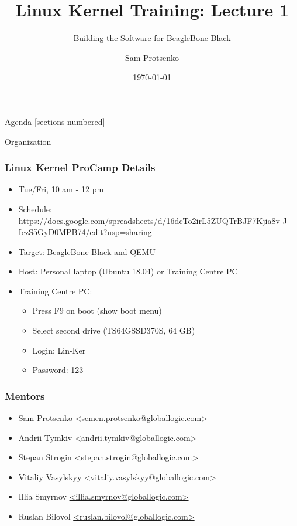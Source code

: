 \documentclass[aspectratio=169]{beamer}
\title{Linux Kernel Training: Lecture 1}
\subtitle{Building the Software for BeagleBone Black}
\date{\today}
\author{Sam Protsenko}
\institute{GlobalLogic}
\begin{document}
\maketitle

\begin{frame}{Agenda}
  [sections numbered]
  \tableofcontents[hideallsubsections]
\end{frame}

\begin{frame}[standout]
  Organization
\end{frame}

\begin{frame}
  \frametitle{Linux Kernel ProCamp Details}
  \begin{itemize}
  \item Tue/Fri, 10 am - 12 pm
  \item Schedule: \url{https://docs.google.com/spreadsheets/d/16dcTo2irL5ZUQTrBJF7Kjia8v-J--IezS5GyD0MPB74/edit?usp=sharing}
  \item Target: BeagleBone Black and QEMU
  \item Host: Personal laptop (Ubuntu 18.04) or Training Centre PC
  \item Training Centre PC:
    \begin{itemize}
    \item Press F9 on boot (show boot menu)
    \item Select second drive (TS64GSSD370S, 64 GB)
    \item Login: Lin-Ker
    \item Password: 123
    \end{itemize}
  \end{itemize}
\end{frame}

\begin{frame}
  \frametitle{Mentors}
  \begin{itemize}
  \item Sam Protsenko \href{mailto:semen.protsenko@globallogic.com}{<semen.protsenko@globallogic.com>}
  \item Andrii Tymkiv \href{mailto:andrii.tymkiv@globallogic.com}{<andrii.tymkiv@globallogic.com>}
  \item Stepan Strogin \href{mailto:stepan.strogin@globallogic.com}{<stepan.strogin@globallogic.com>}
  \item Vitaliy Vasylskyy \href{mailto:vitaliy.vasylskyy@globallogic.com}{<vitaliy.vasylskyy@globallogic.com>}
  \item Illia Smyrnov \href{mailto:illia.smyrnov@globallogic.com}{<illia.smyrnov@globallogic.com>}
  \item Ruslan Bilovol \href{mailto:ruslan.bilovol@globallogic.com}{<ruslan.bilovol@globallogic.com>}
  \end{itemize}
\end{frame}
\end{document}
